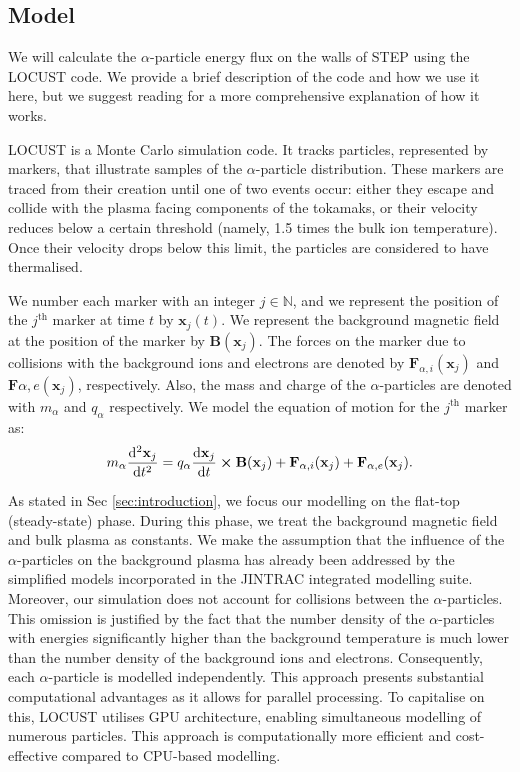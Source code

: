 \documentclass[10pt, a4paper, twoside]{article}
\begin{document}
\subsection{Model}

We will calculate the $\alpha$-particle energy flux on the walls of STEP using the LOCUST code. We provide a brief description of the code and how we use it here, but we suggest reading \cite{akers2018, ward2021} for a more comprehensive explanation of how it works.

LOCUST is a Monte Carlo simulation code. It tracks particles, represented by markers, that illustrate samples of the $\alpha$-particle distribution. These markers are traced from their creation until one of two events occur: either they escape and collide with the plasma facing components of the tokamaks, or their velocity reduces below a certain threshold (namely, 1.5 times the bulk ion temperature). Once their velocity drops below this limit, the particles are considered to have thermalised.

We number each marker with an integer $j \in \mathbb{N}$, and we represent the position of the $j^{\text{th}}$ marker at time $t$ by $\mathbf{x}_j(t)$.
We represent the background magnetic field at the position of the marker by $\textbf{B}(\mathbf{x}_j)$.
The forces on the marker due to collisions with the background ions and electrons are denoted by $\textbf{F}_{\alpha,i}(\mathbf{x}_j)$ and $\textbf{F}{\alpha,e}(\mathbf{x}_j)$, respectively.
Also, the mass and charge of the $\alpha$-particles are denoted with $m_\alpha$ and $q_\alpha$ respectively.
We model the equation of motion for the $j^{\text{th}}$ marker as:
\begin{equation}
m_\alpha\dv[2]{\mathbf{x}_j}{t} = q_\alpha\dv{\mathbf{x}_j}{t}\cross\textbf{B}(\mathbf{x}_j) + \textbf{F}_{\alpha,i}(\mathbf{x}_j) + \textbf{F}_{\alpha,e}(\mathbf{x}_j).
\end{equation}

As stated in Sec \ref{sec:introduction}, we focus our modelling on the flat-top (steady-state) phase. During this phase, we treat the background magnetic field and bulk plasma as constants. We make the assumption that the influence of the $\alpha$-particles on the background plasma has already been addressed by the simplified models incorporated in the JINTRAC integrated modelling suite.
Moreover, our simulation does not account for collisions between the $\alpha$-particles. This omission is justified by the fact that the number density of the $\alpha$-particles with energies significantly higher than the background temperature is much lower than the number density of the background ions and electrons. Consequently, each $\alpha$-particle is modelled independently. This approach presents substantial computational advantages as it allows for parallel  processing.
To capitalise on this, LOCUST utilises GPU architecture, enabling simultaneous modelling of numerous particles. This approach is computationally more efficient and cost-effective compared to CPU-based modelling.
\end{document}
